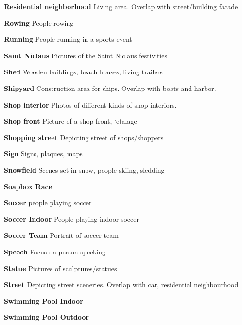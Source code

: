 \noindent\textbf{Residential neighborhood}
Living area. Overlap with street/building facade

\noindent\textbf{Rowing}
People rowing

\noindent\textbf{Running}
People running in a sports event

\noindent\textbf{Saint Niclaus}
Pictures of the Saint Niclaus festivities

\noindent\textbf{Shed}
Wooden buildings, beach houses, living trailers

\noindent\textbf{Shipyard}
Construction area for ships. Overlap with boats and harbor. 

\noindent\textbf{Shop interior}
Photos of different kinds of shop interiors. 

\noindent\textbf{Shop front}
Picture of a shop front, ‘etalage’

\noindent\textbf{Shopping street}
Depicting street of shops/shoppers

\noindent\textbf{Sign}
Signs, plaques, maps


\noindent\textbf{Snowfield}
Scenes set in snow, people skiing, sledding

\noindent\textbf{Soapbox Race}

\noindent\textbf{Soccer}
people playing soccer

\noindent\textbf{Soccer Indoor}
People playing indoor soccer

\noindent\textbf{Soccer Team}
Portrait of soccer team

\noindent\textbf{Speech}
Focus on person specking

\noindent\textbf{Statue}
Pictures of sculptures/statues

\noindent\textbf{Street}
Depicting street sceneries. Overlap with car, residential neighbourhood 


\noindent\textbf{Swimming Pool Indoor}

\noindent\textbf{Swimming Pool Outdoor}

%
%
%

